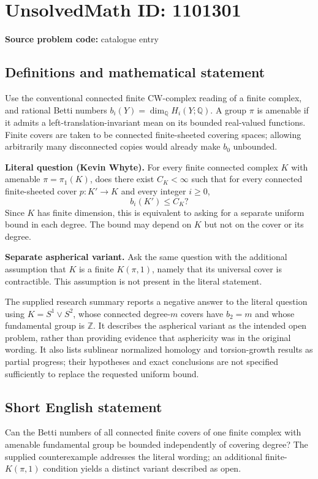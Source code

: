 \documentclass[11pt]{article}
\begin{document}
\section*{UnsolvedMath ID: 1101301}
\textbf{Source problem code:} catalogue entry
\subsection{Definitions and mathematical statement}
Use the conventional connected finite CW-complex reading of a finite complex, and rational Betti numbers $b_i(Y)=\dim_{\mathbb Q}H_i(Y;\mathbb Q)$. A group $\pi$ is amenable if it admits a left-translation-invariant mean on its bounded real-valued functions. Finite covers are taken to be connected finite-sheeted covering spaces; allowing arbitrarily many disconnected copies would already make $b_0$ unbounded.

\textbf{Literal question (Kevin Whyte).} For every finite connected complex $K$ with amenable $\pi=\pi_1(K)$, does there exist $C_K<\infty$ such that for every connected finite-sheeted cover $p:K'\to K$ and every integer $i\geq0$,
\[
b_i(K')\leq C_K?
\]
Since $K$ has finite dimension, this is equivalent to asking for a separate uniform bound in each degree. The bound may depend on $K$ but not on the cover or its degree.

\textbf{Separate aspherical variant.} Ask the same question with the additional assumption that $K$ is a finite $K(\pi,1)$, namely that its universal cover is contractible. This assumption is not present in the literal statement.

The supplied research summary reports a negative answer to the literal question using $K=S^1\vee S^2$, whose connected degree-$m$ covers have $b_2=m$ and whose fundamental group is $\mathbb Z$. It describes the aspherical variant as the intended open problem, rather than providing evidence that asphericity was in the original wording. It also lists sublinear normalized homology and torsion-growth results as partial progress; their hypotheses and exact conclusions are not specified sufficiently to replace the requested uniform bound.
\subsection{Short English statement}
Can the Betti numbers of all connected finite covers of one finite complex with amenable fundamental group be bounded independently of covering degree? The supplied counterexample addresses the literal wording; an additional finite-$K(\pi,1)$ condition yields a distinct variant described as open.
\end{document}
